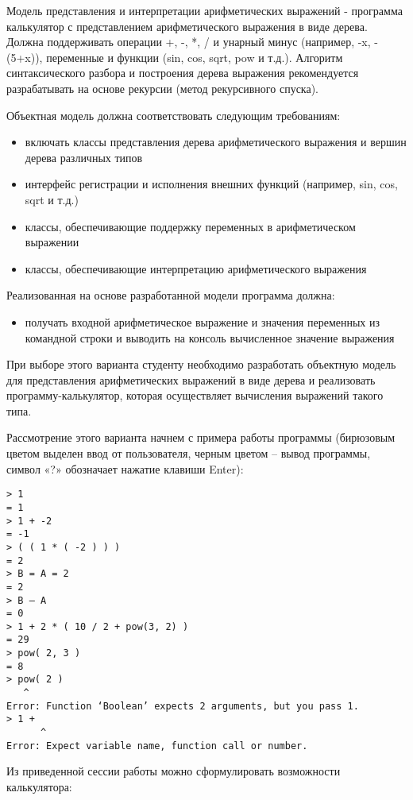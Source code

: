 \documentclass[a4paper,12pt]{article}
\begin{document}
Модель представления и интерпретации арифметических выражений -
программа калькулятор с представлением арифметического выражения в
виде дерева. Должна поддерживать операции +, -, *, / и унарный минус
(например, -x, -(5+x)), переменные и функции (sin, cos, sqrt, pow и
т.д.). Алгоритм синтаксического разбора и построения дерева выражения
рекомендуется разрабатывать на основе рекурсии (метод рекурсивного
спуска).

Объектная модель должна соответствовать следующим требованиям:

\begin{itemize}
\item включать классы представления дерева арифметического выражения и
  вершин дерева различных типов
\item интерфейс регистрации и исполнения внешних функций (например, sin,
  cos, sqrt и т.д.)
\item классы, обеспечивающие поддержку переменных в арифметическом
  выражении
\item классы, обеспечивающие интерпретацию арифметического выражения
\end{itemize}

Реализованная на основе разработанной модели программа должна: 

\begin{itemize}
\item получать входной арифметическое выражение и значения переменных
  из командной строки и выводить на консоль вычисленное значение
  выражения
\end{itemize}

При выборе этого варианта студенту необходимо разработать объектную
модель для представления арифметических выражений в виде дерева и
реализовать программу-калькулятор, которая осуществляет вычисления
выражений такого типа.

Рассмотрение этого варианта начнем с примера работы программы
(бирюзовым цветом выделен ввод от пользователя, черным цветом – вывод
программы, символ «?» обозначает нажатие клавиши Enter):

\begin{verbatim}
> 1
= 1
> 1 + -2
= -1
> ( ( 1 * ( -2 ) ) )
= 2
> B = A = 2
= 2
> B – A
= 0
> 1 + 2 * ( 10 / 2 + pow(3, 2) )
= 29
> pow( 2, 3 )
= 8
> pow( 2 )
   ^       
Error: Function ‘Boolean’ expects 2 arguments, but you pass 1.
> 1 +
      ^
Error: Expect variable name, function call or number.
\end{verbatim}

Из приведенной сессии работы можно сформулировать возможности калькулятора:
\end{document}
